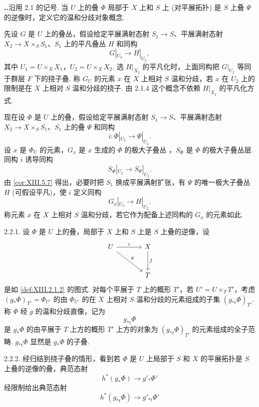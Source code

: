 \noindent\textbf{\thesection..}\quad 沿用 2.1 的记号. 当 $U$ 上的叠 $\Phi$ 局部于 $X$ 上和 $S$ 上 (对平展拓扑) 是 $S$ 上叠 $\Psi$ 的逆像时，定义它的温和分歧对象概念.

先设 $G$ 是 $U$ 上的叠丛，假设给定平展满射态射 $S_1 \to S$、平展满射态射 $X_2 \to X \times_S S_1$、$S_1$ 上的平凡叠丛 $H$ 和同构
\[
G|_{U_2} \longrightarrow H|_{U_2},
\]
其中 $U_1 = U \times_X X_1$，$U_2 = U \times_X X_2$. 选 $H|_{X_2}$ 的平凡化时，上面同构把 $G|_{U_2}$ 等同于群层 $F$ 下的挠子叠. 称 $G_U$ 的元素 $x$ 在 $X$ 上相对 $S$ 温和分歧，若 $x$ 在 $U_2$ 上的限制是在 $X$ 上相对 $S$ 温和分歧的挠子. 由 2.1.4 这个概念不依赖 $H|_{X_2}$ 的平凡化方式.

现在设 $\Phi$ 是 $U$ 上的叠，假设给定平展满射态射 $S_1 \to S$、平展满射态射 $X_2 \to X \times_S S_1$、$S_1$ 上的叠 $\Psi$ 和同构
\[
i \colon \Phi|_{U_2} \longrightarrow \Psi|_{U_2}.
\]
设 $x$ 是 $\Phi_U$ 的元素，$G_x$ 是 $x$ 生成的 $\Phi$ 的极大子叠丛 \cite[III 2.1.7]{exp13-1}，$S_\Phi$ 是 $\Phi$ 的极大子叠丛层. 同构 $i$ 诱导同构
\[
S_\Phi|_{U_2} \longrightarrow S_\Psi|_{U_2}.
\]
由 \ref{cor:XIII.5.7} 得出，必要时把 $S_1$ 换成平展满射扩张，有 $\Psi$ 的唯一极大子叠丛 $H$ (可假设平凡)，使 $i$ 定义同构
\[
G_x|_{U_2} \longrightarrow H|_{U_2}.
\]
称元素 $x$ 在 $X$ 上相对 $S$ 温和分歧，若它作为配备上述同构的 $G_x$ 的元素如此.

2.2.1. 设 $\Phi$ 是 $U$ 上的叠，局部于 $X$ 上和 $S$ 上是 $S$ 上叠的逆像，设
\[
\begin{tikzcd}[row sep=large, column sep=large]
U \arrow[r,"i"] \arrow[dr,"g"] & X \arrow[d,"f"] \\
& T
\end{tikzcd}
\]
是如 \ref{def:XIII.2.1.2} 的图式. 对每个平展于 $T$ 上的概形 $T'$，若 $U' = U \times_T T'$，考虑 $(g_* \Phi)_{T'} = \Phi_{U'}$ 的由 $\Phi_{U'}$ 的在 $X$ 上相对 $S$ 温和分歧的元素组成的子集 $(g_{*t} \Phi)_{T'}$. 称 $\Phi$ 经 $g$ 的温和分歧直像，记为
\[
g_{*t} \Phi
\]
是 $g_* \Phi$ 的由平展于 $T$ 上方的概形 $T'$ 上方的对象为 $(g_{*t} \Phi)_{T'}$ 的元素组成的全子范畴. $g_{*t} \Phi$ 显然是 $g_* \Phi$ 的子叠.

2.2.2. 经归结到挠子叠的情形，看到若 $\Phi$ 是 $U$ 上局部于 $S$ 和 $X$ 的平展拓扑是 $S$ 上叠的逆像的叠，典范态射
\[
h^{*}(g_* \Phi) \longrightarrow g'_* \Phi'
\]
经限制给出典范态射
\[
h^{*}(g_{*t} \Phi) \longrightarrow g'_{*t} \Phi'
\]

